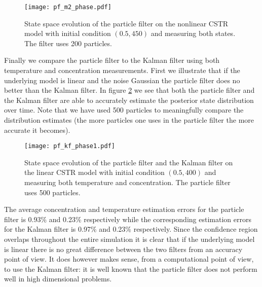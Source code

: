 \begin{figure}[H] 
\centering
\texttt{[image: pf\_m2\_phase.pdf]}
\caption{State space evolution of the particle filter on the nonlinear CSTR model with initial condition $(0.5, 450)$ and measuring both states. The filter uses 200 particles.}
\label{fig_pf_m2_phase}
\end{figure}
Finally we compare the particle filter to the Kalman filter using both temperature and concentration measurements. First we illustrate that if the underlying model is linear and the noise Gaussian the particle filter does no better than the Kalman filter. In figure \ref{fig_pf_kf_phase1} we see that both the particle filter and the Kalman filter are able to accurately estimate the posterior state distribution over time. Note that we have used 500 particles to meaningfully compare the distribution estimates (the more particles one uses in the particle filter the more accurate it becomes).
\begin{figure}[H] 
\centering
\texttt{[image: pf\_kf\_phase1.pdf]}
\caption{State space evolution of the particle filter and the Kalman filter on the linear CSTR model with initial condition $(0.5, 400)$ and measuring both temperature and concentration. The particle filter uses 500 particles.}
\label{fig_pf_kf_phase1}
\end{figure}
The average concentration and temperature estimation errors for the particle filter is 0.93\% and 0.23\% respectively while the corresponding estimation errors for the Kalman filter is 0.97\% and 0.23\% respectively. Since the confidence region overlaps throughout the entire simulation it is clear that if the underlying model is linear there is no great difference between the two filters from an accuracy point of view. It does however makes sense, from a computational point of view, to use the Kalman filter: it is well known that the particle filter does not perform well in high dimensional problems\cite{snyder}. 

